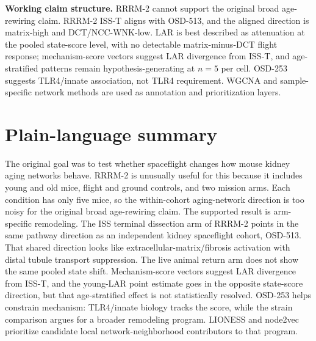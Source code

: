 \documentclass[11pt]{article}
\begin{document}
\vspace{0.8em}
\noindent\textbf{Working claim structure.}
RRRM-2 cannot support the original broad age-rewiring claim. RRRM-2 ISS-T aligns with OSD-513, and the aligned direction is matrix-high and DCT/NCC-WNK-low. LAR is best described as attenuation at the pooled state-score level, with no detectable matrix-minus-DCT flight response; mechanism-score vectors suggest LAR divergence from ISS-T, and age-stratified patterns remain hypothesis-generating at $n=5$ per cell. OSD-253 suggests TLR4/innate association, not TLR4 requirement. WGCNA and sample-specific network methods are used as annotation and prioritization layers.

\clearpage

\section*{Plain-language summary}

\noindent
The original goal was to test whether spaceflight changes how mouse kidney aging networks behave. RRRM-2 is unusually useful for this because it includes young and old mice, flight and ground controls, and two mission arms. Each condition has only five mice, so the within-cohort aging-network direction is too noisy for the original broad age-rewiring claim. The supported result is arm-specific remodeling. The ISS terminal dissection arm of RRRM-2 points in the same pathway direction as an independent kidney spaceflight cohort, OSD-513. That shared direction looks like extracellular-matrix/fibrosis activation with distal tubule transport suppression. The live animal return arm does not show the same pooled state shift. Mechanism-score vectors suggest LAR divergence from ISS-T, and the young-LAR point estimate goes in the opposite state-score direction, but that age-stratified effect is not statistically resolved. OSD-253 helps constrain mechanism: TLR4/innate biology tracks the score, while the strain comparison argues for a broader remodeling program. LIONESS and node2vec prioritize candidate local network-neighborhood contributors to that program.

\vspace{0.8em}
\end{document}
